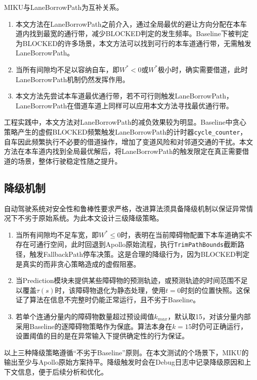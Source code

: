 MIKU与LaneBorrowPath为互补关系。
\begin{enumerate}
\item 本文方法在LaneBorrowPath之前介入，通过全局最优的避让方向分配在本车道内找到最宽的通行带，减少BLOCKED判定的发生频率。Baseline下被判定为BLOCKED的许多场景，本文方法可以找到可行的本车道通行带，无需触发LaneBorrowPath。

\item 当所有间隙均不足以容纳自车，即$W^{*} < 0$或$W^{*}$极小时，确实需要借道，此时LaneBorrowPath机制仍然发挥作用。

\item 本文方法先尝试本车道最优通行带，若不可行则触发LaneBorrowPath，LaneBorrowPath在借道车道上同样可以应用本文方法寻找最优通行带。
\end{enumerate}

工程实践中，本文方法对LaneBorrowPath的减负效果较为明显。Baseline中贪心策略产生的虚假BLOCKED频繁触发LaneBorrowPath的计时器\texttt{cycle\_counter}，自车因此频繁执行不必要的借道操作，增加了变道风险和对邻道交通的干扰。本文方法在本车道内找到全局最优解后，将LaneBorrowPath的触发限定在真正需要借道的场景，整体行驶稳定性随之提升。

\subsection{降级机制}
自动驾驶系统对安全性和鲁棒性要求严格，改进算法须具备降级机制以保证异常情况下不劣于原始系统。为此本文设计三级降级策略。
\begin{enumerate}
\item 当所有间隙均不足车宽，即$W^{*} \leq 0$时，表明在当前障碍物配置下本车道确实不存在可通行空间，此时回退到Apollo原始流程，执行\texttt{TrimPathBounds}截断路径，触发FallbackPath停车决策。这是合理的降级行为，因为BLOCKED判定是真实的而非贪心策略造成的虚假阻塞。

\item 当Prediction模块未提供某些障碍物的预测轨迹，或预测轨迹的时间范围不足以覆盖$\tau(s)$时，该障碍物退化为静态处理，使用$t = 0$时刻的位置快照。这保证了算法在信息不完整时仍能正常运行，且不劣于Baseline。

\item 若单个连通分量内的障碍物数量超过预设阈值$k_{max}$，默认取15，对该分量内部采用Baseline的逐障碍物策略作为保底。算法本身在$k = 15$时仍可正确运行，设置阈值的目的是在异常输入下提供确定性的行为保证。
\end{enumerate}

以上三种降级策略遵循``不劣于Baseline''原则。在本文测试的\MScenarioTotal{}个场景下，MIKU的输出至少与Apollo原始方案持平。降级触发时会在Debug日志中记录降级原因和上下文信息，便于后续分析和优化。


